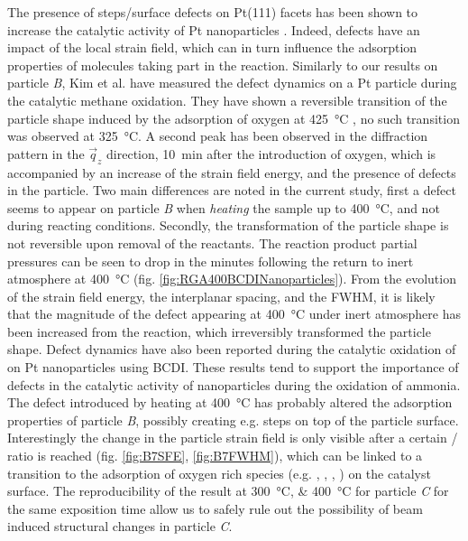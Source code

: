 The presence of steps/surface defects on Pt(111) facets has been shown to increase the catalytic activity of Pt nanoparticles \parencite{Segner1984, Chen2012}.
Indeed, defects have an impact of the local strain field, which can in turn influence the adsorption properties of molecules taking part in the reaction.
Similarly to our results on particle \textit{B}, Kim et al. \parencite*{Kim2019} have measured the defect dynamics on a Pt particle during the catalytic methane oxidation.
They have shown a reversible transition of the particle shape induced by the adsorption of oxygen at \qty{425}{\degreeCelsius}
, no such transition was observed at \qty{325}{\degreeCelsius}.
A second peak has been observed in the diffraction pattern in the $\vec{q}_z$ direction, \qty{10}{\minute} after the introduction of oxygen, which is accompanied by an increase of the strain field energy, and the presence of defects in the particle.
Two main differences are noted in the current study, first a defect seems to appear on particle \textit{B} when \textit{heating} the sample up to \qty{400}{\degreeCelsius}, and not during reacting conditions.
Secondly, the transformation of the particle shape is not reversible upon removal of the reactants.
The reaction product partial pressures can be seen to drop in the minutes following the return to inert atmosphere at \qty{400}{\degreeCelsius} (fig. \ref{fig:RGA400BCDINanoparticles}).
From the evolution of the strain field energy, the interplanar spacing, and the FWHM, it is likely that the magnitude of the defect appearing at \qty{400}{\degreeCelsius} under inert atmosphere has been increased from the reaction, which irreversibly transformed the particle shape.
Defect dynamics have also been reported during the catalytic oxidation of  on Pt nanoparticles \parencite{Carnis2021b} using BCDI.
These results tend to support the importance of defects in the catalytic activity of nanoparticles during the oxidation of ammonia.
The defect introduced by heating at \qty{400}{\degreeCelsius} has probably altered the adsorption properties of particle \textit{B}, possibly creating e.g. steps on top of the particle surface.
Interestingly the change in the particle strain field is only visible after a certain / ratio is reached (fig. \ref{fig:B7SFE}, \ref{fig:B7FWHM}), which can be linked to a transition to the adsorption of oxygen rich species (e.g. , , , ) on the catalyst surface.
The reproducibility of the result at \qtylist{300;400}{\degreeCelsius} for particle \textit{C} for the same exposition time allow us to safely rule out the possibility of beam induced structural changes in particle \textit{C}.

